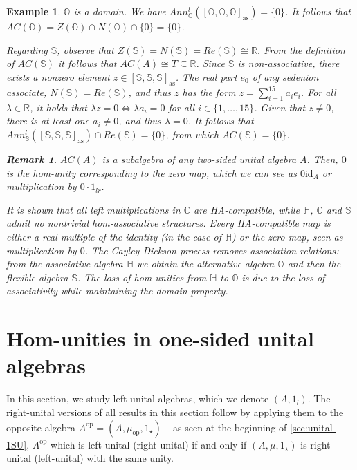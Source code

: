 \documentclass[12pt]{article}
\newtheorem{example}[theorem]{Example}
\newtheorem{remark}[theorem]{Remark}
\begin{document}
\begin{example}
			$\mathbb{O}$ is a domain. We have $Ann_\mathbb{O}^l([\mathbb{O},\mathbb{O},\mathbb{O}]_{\mathrm{as}})=\{0\}$. It follows that $AC(\mathbb{O})=Z(\mathbb{O})\cap N(\mathbb{O})\cap\{0\}=\{0\}$.
			
			Regarding $\mathbb{S}$, observe that $Z(\mathbb{S})=N(\mathbb{S})=Re(\mathbb{S})\cong\mathbb{R}$. From the definition of $AC(\mathbb{S})$ it follows that $AC(A)\cong T\subseteq\mathbb{R}$.  Since $\mathbb{S}$ is non-associative, there exists a nonzero element  $z\in [\mathbb{S},\mathbb{S},\mathbb{S}]_{\mathrm{as}}$. The real part $e_0$ of any sedenion associate, $N(\mathbb{S})=Re(\mathbb{S})$, and thus $z$ has the form $z=\sum\limits_{i=1}^{15}a_ie_i$. For all $\lambda\in\mathbb{R}$, it holds that $\lambda z=0\Leftrightarrow \lambda a_i=0$ for all $i\in\{1,\dots,15\}$. Given that $z\neq 0$, there is at least one $a_i\neq 0$, and thus $\lambda=0$. It follows that $Ann_\mathbb{S}^l([\mathbb{S},\mathbb{S},\mathbb{S}]_{\mathrm{as}})\cap Re(\mathbb{S})=\{0\}$, from which $AC(\mathbb{S})=\{0\}$.
			\begin{remark}
				$AC(A)$ is a subalgebra of any two-sided unital algebra $A$. Then, $0$ is the hom-unity corresponding to the zero map, which we can see as $0\mathrm{id}_A$ or multiplication by $0\cdot 1_{lr}$.
			\end{remark}
			It is shown that all left multiplications in $\mathbb{C}$ are HA-compatible, while $\mathbb{H}$, $\mathbb{O}$ and $\mathbb{S}$ admit no nontrivial hom-associative structures. Every HA-compatible map is either a real multiple of the identity (in the case of $\mathbb{H}$) or the zero map, seen as multiplication by $0$.
			The Cayley-Dickson process removes association relations: from the associative algebra $\mathbb{H}$ we obtain the alternative algebra $\mathbb{O}$ and then the flexible algebra $\mathbb{S}$. The loss of hom-unities from $\mathbb{H}$ to $\mathbb{O}$ is due to the loss of associativity while maintaining the domain property.
		\end{example}
		
		
		\section{Hom-unities in one-sided unital algebras}\label{sec:hom-unities-1SU}
		In this section, we study left-unital algebras, which we denote $(A,1_l)$. The right-unital versions of all results in this section follow by applying them to the opposite algebra $A^{\mathrm{op}}=(A,\mu_{\mathrm{op}},1_\star)$ -- as seen at the beginning of \cref{sec:unital-1SU}, $A^{\mathrm{op}}$ which is left-unital (right-unital) if and only if $(A,\mu,1_\star)$ is right-unital (left-unital) with the same unity.
		
\end{document}
